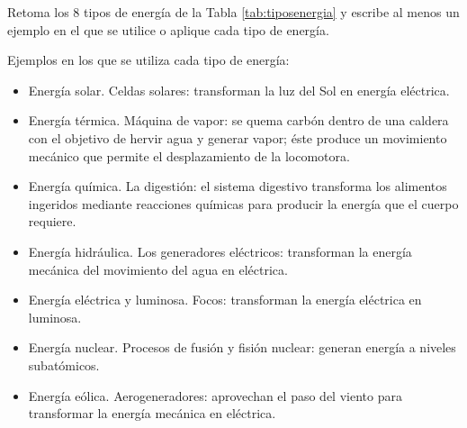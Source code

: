 Retoma los 8 tipos de energía de la Tabla \ref{tab:tiposenergia} y escribe al menos un ejemplo en el que se utilice o aplique cada tipo de energía.


\begin{solutionbox}{7cm}
    Ejemplos en los que se utiliza cada tipo de energía:
    \begin{itemize}
        \item Energía solar. Celdas solares: transforman la luz del Sol en energía eléctrica.
        \item Energía térmica. Máquina de vapor: se quema carbón dentro de una caldera
              con el objetivo de hervir agua y generar vapor; éste produce un movimiento
              mecánico que permite el desplazamiento de la locomotora.
        \item Energía química. La digestión: el sistema digestivo transforma los alimentos ingeridos mediante reacciones químicas para producir la energía que el
              cuerpo requiere.
        \item Energía hidráulica. Los generadores eléctricos: transforman la energía mecánica del movimiento del agua en eléctrica.
        \item Energía eléctrica y luminosa. Focos: transforman la energía eléctrica en
              luminosa.
        \item Energía nuclear. Procesos de fusión y fisión nuclear: generan energía a niveles subatómicos.
        \item Energía eólica. Aerogeneradores: aprovechan el paso del viento para transformar la energía mecánica en eléctrica.
    \end{itemize}
\end{solutionbox}
